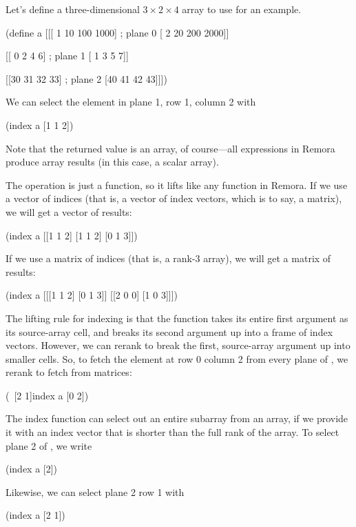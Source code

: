 Let's define a three-dimensional $3 \times 2 \times 4$ array
to use for an example.
\begin{code}
    (define a [[[ 1   10  100 1000]  ; plane 0
                [ 2   20  200 2000]]

               [[ 0    2    4    6]  ; plane 1
                [ 1    3    5    7]]

               [[30   31   32   33]  ; plane 2
                [40   41   42   43]]])\end{code}
We can select the element in plane 1, row 1, column 2 with
\begin{code}
    (index a [1 1 2])
\end{code}
Note that the returned value is an array, of course---all
expressions in Remora produce array results
(in this case, a scalar array).

The  operation is just a function,
so it lifts like any function in Remora.
If we use a vector of indices
(that is, a vector of index vectors, which is to say, a matrix),
we will get a vector of results:
\begin{code}
    (index a [[1 1 2]
              [1 1 2]
              [0 1 3]])
\result{[5 5 2000]}\end{code}

If we use a matrix of indices (that is, a rank-3 array),
we will get a matrix of results:
\begin{code}
    (index a [[[1 1 2]  [0 1 3]]
              [[2 0 0]  [1 0 3]]])
\result{[[5  2000]
 [30    6]]}\end{code}

The lifting rule for indexing is that the  function
takes its entire first argument as its source-array cell,
and breaks its second argument up into a frame of index vectors.
However, we can rerank  to break the first, source-array
argument up into smaller cells.
So, to fetch the element at row 0 column 2 from every plane of ,
we rerank  to fetch from matrices:
\begin{code}
    (~[2 1]index a [0 2])
\result{[100 4 32]}\end{code}

The index function can select out an entire subarray from an array,
if we provide it with an index vector that is shorter than the full
rank of the array.
To select plane 2 of , we write
\begin{code}
    (index a [2])
\result{[[30 31 32 33]
 [40 41 42 43]]}\end{code}
Likewise, we can select plane 2 row 1 with
\begin{code}
    (index a [2 1])
\result{[40 41 42 43]}\end{code}
%
%

